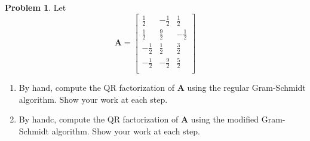 \documentclass[12pt]{article}
\theoremstyle{definition}
\newtheorem{problem}{Problem}
\renewcommand{\vec}{\mathbf}
\begin{document}
\clearpage
\begin{problem}
    Let \[
        \vec{A} = 
        \begin{bmatrix}
        \frac{1}{2} & -\frac{1}{2} & \frac{1}{2} \\
        \frac{1}{2} & \frac{9}{2} & -\frac{1}{2} \\
        -\frac{1}{2} & \frac{1}{2} & \frac{3}{2} \\
        -\frac{1}{2} & -\frac{9}{2} & \frac{5}{2} \\
        \end{bmatrix}
    \]
    \begin{enumerate}
        \item By hand, compute the QR factorization of $\vec{A}$ using the regular Gram-Schmidt algorithm.
        Show your work at each step.
        \item By handc, compute the QR factorization of $\vec{A}$ using the modified Gram-Schmidt algorithm.
        Show your work at each step.
    \end{enumerate}
\end{problem}
\end{document}
